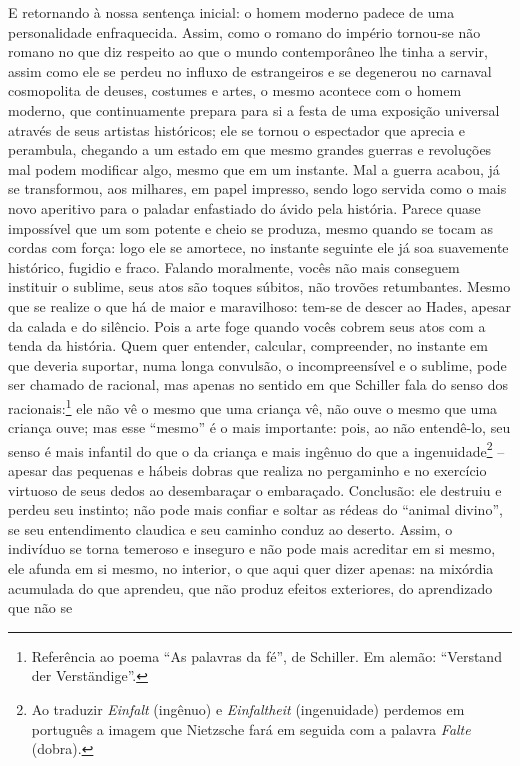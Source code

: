 E retornando à nossa sentença inicial: o homem moderno padece de uma
personalidade enfraquecida. Assim, como o romano do império tornou-se
não romano no que diz respeito ao que o mundo contemporâneo lhe tinha a
servir, assim como ele se perdeu no influxo de estrangeiros e se
degenerou no carnaval cosmopolita de deuses, costumes e artes, o mesmo
acontece com o homem moderno, que continuamente prepara para si a festa
de uma exposição universal através de seus artistas históricos; ele se
tornou o espectador que aprecia e perambula, chegando a um estado em que
mesmo grandes guerras e revoluções mal podem modificar algo, mesmo que
em um instante. Mal a guerra acabou, já se transformou, aos milhares,
em papel impresso, sendo logo servida como o mais novo aperitivo para o
paladar enfastiado do ávido pela história. Parece quase impossível que
um som potente e cheio se produza, mesmo quando se tocam as cordas com
força: logo ele se amortece, no instante seguinte ele já soa suavemente
histórico, fugidio e fraco. Falando moralmente, vocês não mais conseguem
instituir o sublime, seus atos são toques súbitos, não trovões
retumbantes. Mesmo que se realize o que há de maior e maravilhoso:
tem-se de descer ao Hades, apesar da calada e do silêncio. Pois a arte
foge quando vocês cobrem seus atos com a tenda da história. Quem quer
entender, calcular, compreender, no instante em que deveria suportar,
numa longa convulsão, o incompreensível e o sublime, pode ser chamado de
racional, mas apenas no sentido em que Schiller fala do senso dos
racionais:\footnote{Referência ao poema ``As palavras da fé'', de
  Schiller. Em alemão: ``Verstand der Verständige''.} ele não vê o
mesmo que uma criança vê, não ouve o mesmo que uma criança ouve; mas
esse ``mesmo'' é o mais importante: pois, ao não entendê-lo, seu senso é
mais infantil do que o da criança e mais ingênuo do que a
ingenuidade\footnote{Ao traduzir \emph{Einfalt} (ingênuo) e
  \emph{Einfaltheit} (ingenuidade) perdemos em português a imagem que
  Nietzsche fará em seguida com a palavra \emph{Falte} (dobra).} --
apesar das pequenas e hábeis dobras que realiza no pergaminho e no
exercício virtuoso de seus dedos ao desembaraçar o embaraçado.
Conclusão: ele destruiu e perdeu seu instinto; não pode mais confiar e
soltar as rédeas do ``animal divino'', se seu entendimento claudica e
seu caminho conduz ao deserto. Assim, o indivíduo se torna temeroso e
inseguro e não pode mais acreditar em si mesmo, ele afunda em si mesmo,
no interior, o que aqui quer dizer apenas: na mixórdia acumulada do que
aprendeu, que não produz efeitos exteriores, do aprendizado que não se
